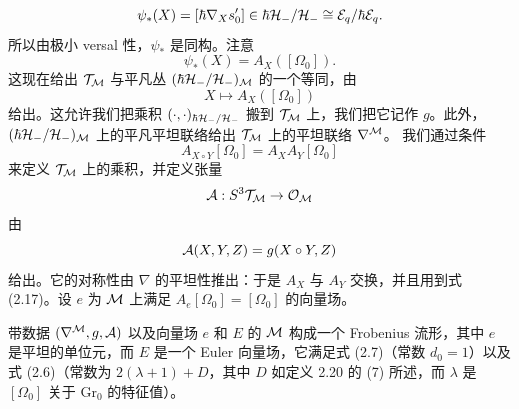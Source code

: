\[
\psi_*(X)=[\hbar\nabla_Xs'_0]\in\hbar\mathcal{H}_-/\mathcal{H}_-\cong\mathcal{E}_q/\hbar\mathcal{E}_q.
\]
所以由极小 versal 性，$\psi_*$ 是同构。注意
\[
\psi_*(X)=A_X([\Omega_0]).
\]
这现在给出 $\mathcal{T}_{\mathcal{M}}$ 与平凡丛 $(\hbar\mathcal{H}_-/\mathcal{H}_-)_{\mathcal{M}}$ 的一个等同，由
\[
X\longmapsto A_X([\Omega_0])
\]
给出。这允许我们把乘积 $(\cdot,\cdot)_{\hbar\mathcal{H}_-/\mathcal{H}_-}$ 搬到 $\mathcal{T}_{\mathcal{M}}$ 上，我们把它记作 $g$。此外，$(\hbar\mathcal{H}_-/\mathcal{H}_-)_{\mathcal{M}}$ 上的平凡平坦联络给出 $\mathcal{T}_{\mathcal{M}}$ 上的平坦联络 $\nabla^{\mathcal{M}}$。
我们通过条件
\[
A_{X\circ Y}[\Omega_0]=A_XA_Y[\Omega_0]
\]
来定义 $\mathcal{T}_{\mathcal{M}}$ 上的乘积，并定义张量
\[
\mathcal{A}:S^3\mathcal{T}_{\mathcal{M}}\to\mathcal{O}_{\mathcal{M}}
\]
由
\[
\mathcal{A}(X,Y,Z)=g(X\circ Y,Z)
\]
给出。它的对称性由 $\nabla$ 的平坦性推出：于是 $A_X$ 与 $A_Y$ 交换，并且用到式 (2.17)。设 $e$ 为 $\mathcal{M}$ 上满足 $A_e[\Omega_0]=[\Omega_0]$ 的向量场。

\begin{theorem}
带数据 $(\nabla^{\mathcal{M}},g,\mathcal{A})$ 以及向量场 $e$ 和 $E$ 的 $\mathcal{M}$ 构成一个 Frobenius 流形，其中 $e$ 是平坦的单位元，而 $E$ 是一个 Euler 向量场，它满足式 (2.7)（常数 $d_0=1$）以及式 (2.6)（常数为 $2(\lambda+1)+D$，其中 $D$ 如定义 2.20 的 (7) 所述，而 $\lambda$ 是 $[\Omega_0]$ 关于 $\mathrm{Gr}_0$ 的特征值）。
\end{theorem}

